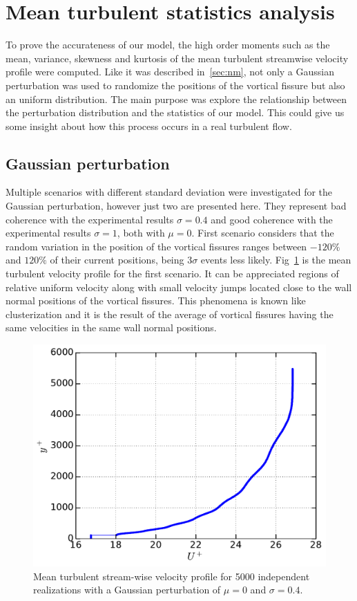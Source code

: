 \documentclass[aps,reprint,amsmath,amssymb,pra]{revtex4-1}%
\begin{document}
\section{Mean turbulent statistics analysis}
To prove the accurateness of our model, the high order moments such as the mean, variance, skewness and kurtosis of the mean turbulent streamwise velocity profile were computed. Like it was described in~\ref{sec:nm}, not only a Gaussian perturbation was used to randomize the positions of the vortical fissure but also an uniform distribution. The main purpose was explore the relationship between the perturbation distribution and the statistics of our model. This could give us some insight about how this process occurs in a real turbulent flow.
\subsection{Gaussian perturbation}
Multiple scenarios with different standard deviation were investigated for the Gaussian perturbation, however just two are presented here. They represent bad coherence with the experimental results $\sigma=0.4$ and good coherence with the experimental results $\sigma=1$, both with $\mu=0$. First scenario considers that the random variation in the position of the vortical fissures ranges between $-120\%$ and $120\%$ of their current positions, being $3\sigma$ events less likely. Fig~\ref{fig:mean_profile} is the mean turbulent velocity profile for the first scenario. It can be appreciated regions of relative uniform velocity along with small velocity jumps located close to the wall normal positions of the vortical fissures. This phenomena is known like clusterization and it is the result of the average of vortical fissures having the same velocities in the same wall normal positions.\\
\begin{figure}[b]
\includegraphics[scale=0.46]{figures/Master_averaged_step_profile_5000_assembles}
\caption{\label{fig:mean_profile} Mean turbulent stream-wise velocity profile for 5000 independent realizations with a Gaussian perturbation of $\mu=0$ and $\sigma=0.4$.}
\end{figure}
\end{document}
